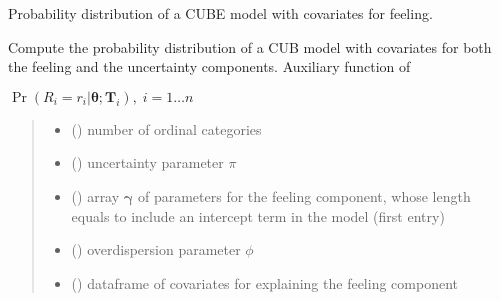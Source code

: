 \documentclass[letterpaper,10pt,english]{sphinxmanual}
\begin{document}

\begin{fulllineitems}
\label{\detokenize{cubmods:cubmods.cube_0w0.prob}}
\pysigstartsignatures
{}
\pysigstopsignatures
\sphinxAtStartPar
Probability distribution of a CUBE model with covariates for feeling.

\sphinxAtStartPar
Compute the probability distribution of a CUB model with covariates for both the feeling 
and the uncertainty components. Auxiliary function of 

\sphinxAtStartPar
\(\Pr(R_i=r_i|\pmb\theta;\pmb T_i),\; i=1 \ldots n\)
\begin{quote}\begin{description}
\begin{itemize}
\item {} 
\sphinxAtStartPar
{} () \textendash{} number of ordinal categories

\item {} 
\sphinxAtStartPar
{} () \textendash{} uncertainty parameter \(\pi\)

\item {} 
\sphinxAtStartPar
{} () \textendash{} array \(\pmb \gamma\) of parameters for the feeling component, whose length equals 
 to include an intercept term in the model (first entry)

\item {} 
\sphinxAtStartPar
{} () \textendash{} overdispersion parameter \(\phi\)

\item {} 
\sphinxAtStartPar
{} () \textendash{} dataframe of covariates for explaining the feeling component


\end{itemize}
\end{description}
\end{quote}
\end{fulllineitems}
\end{document}
